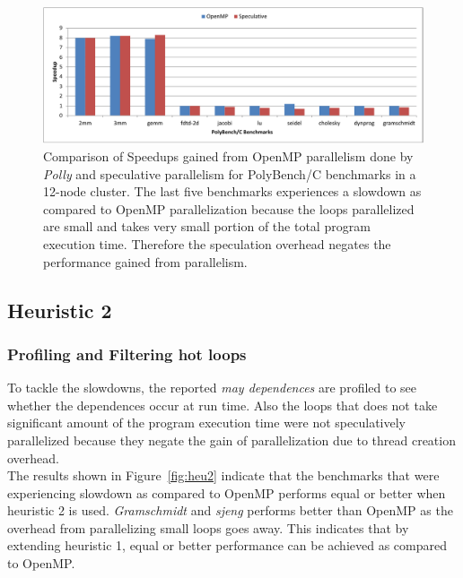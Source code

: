 \documentclass[10pt]{report}          %
\begin{document}
\begin{figure}[h]
\centering
\includegraphics[scale = 0.75]{./pdf/openmp_vs_spec_poly}
\caption{Comparison of Speedups gained from OpenMP parallelism done by \textit{Polly} and speculative parallelism for PolyBench/C benchmarks in a 12-node cluster. The last five benchmarks experiences a slowdown as compared to OpenMP parallelization because the loops parallelized are small and takes very small portion of the total program execution time.  Therefore the speculation overhead negates the performance gained from parallelism.}
\label{fig:openmp_vs_spec_poly}
\end{figure}

\subsection{Heuristic 2}

\subsubsection{Profiling and Filtering hot loops}

To tackle the slowdowns, the reported \textit{may dependences} are profiled to see whether the dependences occur at run time. Also the loops that does not take significant amount of the program execution time were not speculatively parallelized because they negate the gain of parallelization due to thread creation overhead. \\

The results shown in Figure~\ref{fig:heu2} indicate that the benchmarks that were experiencing slowdown as compared to OpenMP performs equal or better  when heuristic 2 is used. \textit{Gramschmidt} and \textit{sjeng} performs better than OpenMP as the overhead from parallelizing small loops goes away.  This indicates that by extending heuristic 1, equal or better performance can be achieved as compared to OpenMP.
\end{document}
